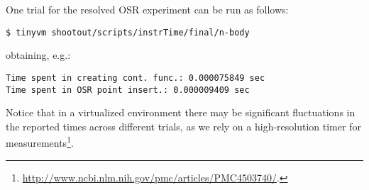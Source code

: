 \noindent One trial for the resolved OSR experiment can be run as follows:
\begin{small}
\begin{verbatim}
$ tinyvm shootout/scripts/instrTime/final/n-body
\end{verbatim}
\end{small}
\noindent obtaining, e.g.:
\begin{small}
\begin{verbatim}
Time spent in creating cont. func.: 0.000075849 sec
Time spent in OSR point insert.: 0.000009409 sec
\end{verbatim}
\end{small}

\noindent Notice that in a virtualized environment there may be significant fluctuations in the reported times across different trials, as we rely on a high-resolution timer for measurements\footnote{\url{http://www.ncbi.nlm.nih.gov/pmc/articles/PMC4503740/}.}.